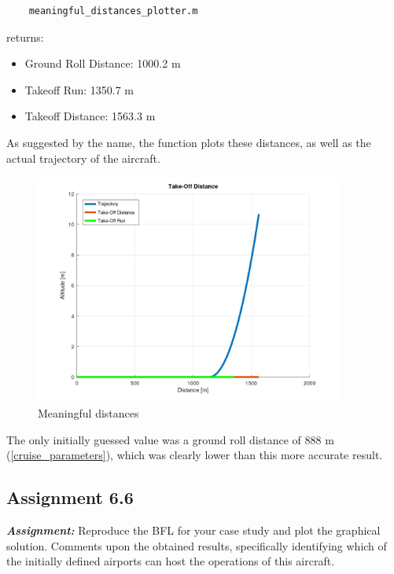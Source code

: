 \documentclass{article}
\begin{document}
\begin{verbatim}
    meaningful_distances_plotter.m
\end{verbatim}

returns:

\begin{itemize}
    \item Ground Roll Distance: 1000.2 m
    \item Takeoff Run: 1350.7 m
    \item Takeoff Distance: 1563.3 m
\end{itemize}

As suggested by the name, the function plots these distances, as well as the actual trajectory of the aircraft. \\ 

\begin{figure}[h!]
    \centering
    \includegraphics[width=0.9\textwidth]{Sources/Plots_and_Pictures/Distances.png}
    \caption{Meaningful distances}
    \label{distances}
\end{figure}

The only initially guessed value was a ground roll distance of 888 m (\ref{cruise_parameters}), which was clearly lower than this more accurate result.

\clearpage






\subsection{Assignment 6.6\label{Assignment_6.6}}

\textbf{\textit{Assignment:}} Reproduce the BFL for your case study and plot the graphical solution. 
Comments upon the obtained results, specifically identifying which of the initially 
defined airports can host the operations of this aircraft. \\ \\ \\ 
\end{document}

